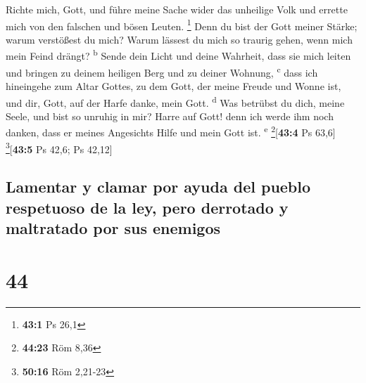  Richte mich, Gott, und führe meine Sache wider das
unheilige Volk und errette mich von den falschen und bösen Leuten.
\footnote{\textbf{43:1} Ps 26,1}  Denn du bist der Gott
meiner Stärke; warum verstößest du mich? Warum lässest du mich so
traurig gehen, wenn mich mein Feind drängt? \textsuperscript{b}
 Sende dein Licht und deine Wahrheit, dass sie mich leiten
und bringen zu deinem heiligen Berg und zu deiner Wohnung,
\textsuperscript{c}  dass ich hineingehe zum Altar Gottes,
zu dem Gott, der meine Freude und Wonne ist, und dir, Gott, auf der
Harfe danke, mein Gott. \textsuperscript{d}  Was betrübst
du dich, meine Seele, und bist so unruhig in mir? Harre auf Gott! denn
ich werde ihm noch danken, dass er meines Angesichts Hilfe und mein Gott
ist. \textsuperscript{e} \footnote{\textbf{44:23} Röm 8,36}{[}\textbf{43:4}
Ps 63,6{]} \footnote{\textbf{50:16} Röm 2,21-23}{[}\textbf{43:5} Ps
42,6; Ps 42,12{]}

\hypertarget{lamentar-y-clamar-por-ayuda-del-pueblo-respetuoso-de-la-ley-pero-derrotado-y-maltratado-por-sus-enemigos}{%
\subsection{Lamentar y clamar por ayuda del pueblo respetuoso de la ley,
pero derrotado y maltratado por sus
enemigos}\label{lamentar-y-clamar-por-ayuda-del-pueblo-respetuoso-de-la-ley-pero-derrotado-y-maltratado-por-sus-enemigos}}

\hypertarget{section-43}{%
\section{44}\label{section-43}}

